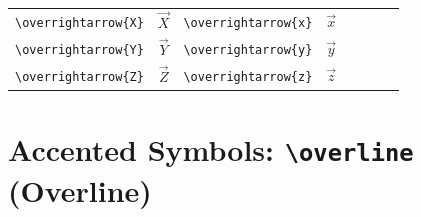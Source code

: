 \documentclass[12pt,a4paper]{article}
\begin{document}
\begin{longtable}{|l|c|l|c|c|l|c|c|}
\verb|\overrightarrow{X}| & $\overrightarrow{X}$ & \verb|\overrightarrow{x}| & $\overrightarrow{x}$ &                &                           &                      & \\
\verb|\overrightarrow{Y}| & $\overrightarrow{Y}$ & \verb|\overrightarrow{y}| & $\overrightarrow{y}$ &                &                           &                      & \\
\verb|\overrightarrow{Z}| & $\overrightarrow{Z}$ & \verb|\overrightarrow{z}| & $\overrightarrow{z}$ &                &                           &                      & \\
\hline
\end{longtable}

\newpage

\section*{Accented Symbols: \texttt{\textbackslash overline} (Overline)}
\end{document}

